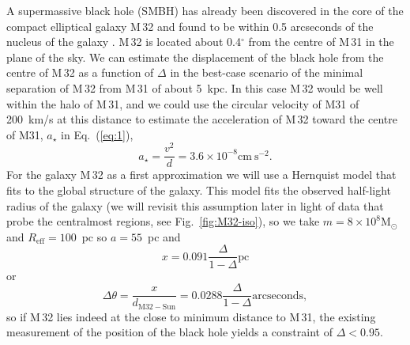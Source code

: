 \documentclass[useAMS,usenatbib]{mn2e}
\newcommand{\msun}{\mathrm{M}_\odot}
\begin{document}
A supermassive black hole (SMBH) has already been discovered in the
core of the compact elliptical galaxy M\,32
\citep{1997Natur.385..610V} and found to be within 0.5 arcseconds of
the nucleus of the galaxy \citep{2015arXiv150203231Y}.  M\,32 is
located about 0.4$^\circ$ from the centre of M\,31 in the plane of the
sky.  We can estimate the displacement of the black hole from the
centre of M\,32 as a function of $\Delta$ in the best-case scenario of
the minimal separation of M\,32 from M\,31 of about 5~kpc.  In this
case M\,32 would be well within the halo of M\,31, and we could use
the circular velocity of M31 of 200~km/s at this distance to estimate
the acceleration of M\,32 toward the centre of M31, $a_\star$ in
Eq.~(\ref{eq:1}),
\begin{equation}
  a_\star = \frac{v^2}{d} = 3.6\times 10^{-8} \mathrm{cm~s}^{-2}
  \label{eq:9}.
\end{equation}
For the galaxy M\,32 as a first approximation we will use a Hernquist
model that fits to the global structure of the galaxy.  This model
fits the observed half-light radius of the galaxy (we will revisit
this assumption later in light of data that probe the centralmost
regions, see Fig.~\ref{fig:M32-iso}), so we take $m=8 \times 10^8 \msun$
and $R_\mathrm{eff} = 100$~pc so $a=55$~pc and
\begin{equation}
  x = 0.091 \frac{\Delta}{1-\Delta} \mathrm{pc}
  \label{eq:10}
\end{equation}
or
\begin{equation}
  \Delta \theta = \frac{x}{d_\mathrm{M32-Sun}} = 0.0288 \frac{\Delta}{1-\Delta} \mathrm{arcseconds},
  \label{eq:11}
\end{equation}
so if M\,32 lies indeed at the close to minimum distance to M\,31, the
existing measurement of the position of the black hole yields a
constraint of $\Delta < 0.95$.
\end{document}
